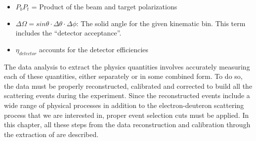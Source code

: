 \begin{itemize}
\begin{comment}    
  \item $N^{+/-}_{e^-}$: Number of incident electrons for +/- helicity states = $\left(\frac{ C_{Fcup}^{+/-}\cdot (10^{-9}/9264)}{Q_{e^-}} \right)\cdot \frac{C_{BPM}}{C_{Fcup}}$ with 
    \begin{itemize}
      \item $C_{Fcup}^{+/-}$: Helicity dependent Faraday-cup counts (live time gated)
      \item $\frac{10^9}{9264}$: Factor for converting Faraday cup counts into coulombs. (The factor 1/9264 converts the counts into nano-coulombs.)
      \item $Q_e = 1.0602\times 10^{-19}(C)$: the electron charge. %
      \item $\frac{C_{BPM}}{C_{Fcup}}$: the ratio of the Beam-Position-Monitor (BPM) and Faraday-cup counts. The BPM is located before the target so its count doesn't suffer the loss, but the Faraday-cup is located at the end of the beamline and because its physical radius is not large enough, parts of the beam's halo are not collected. Since, the size of the halo depends on the amount of material in the beamline as well as on the beam energy, the ratio is a function of the beam energy. For high beam energies such as 3 GeV, the ratio is close to 1 but for the lower beam energies it is lower than 1. For example the ratio is 0.965919 for 2.3 GeV\cite{HK_dXs_extr}. 
    \end{itemize}
\end{comment} 
   \item $P_bP_t$ = Product of the beam and target polarizations
   \item $\Delta\Omega=sin\theta\cdot\Delta\theta\cdot\Delta\phi$: The solid angle for the given kinematic bin. %
   This term includes the ``detector acceptance''.
   \item $\eta_{detector}$ %
   accounts for the detector efficiencies
\end{itemize}

The data analysis to extract the physics quantities involves accurately measuring each of these quantities, either separately or in some combined form. To do so, the data must be properly reconstructed, calibrated and corrected to build all the scattering events during the experiment. Since the reconstructed events include a wide range of physical processes in addition to the electron-deuteron scattering process that we are interested in, proper event selection cuts must be applied. In this chapter, all these steps from the data reconstruction and calibration through the extraction of \gones are described.

